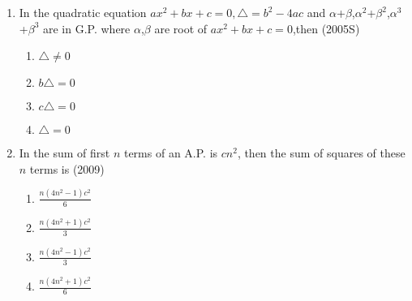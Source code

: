 \documentclass[journal]{IEEEtran}
\theoremstyle{remark}
\begin{document}
\begin{enumerate}
\begin{multicols}{4}
\begin{enumerate}
                \item $-10<x<0$
                \item $0<x<10$
                \item $x>10$
                \end{enumerate}
                \end{multicols}
\item In the quadratic equation $ax^2+bx+c=0,\triangle=b^2-4ac$ and $\alpha$+$\beta$,$\alpha^2$+$\beta^2$,$\alpha^3$+$\beta^3$ are in G.P. where $\alpha$,$\beta $ are root of $ax^2+bx+c=0$,then \hfill(2005S)
                \begin{multicols}{4}
                \begin{enumerate}
                    \item $\triangle\neq0$
                    \item $b\triangle=0$
                    \item $c\triangle=0$
                    \item $\triangle=0$
                \end{enumerate}
                \end{multicols}
\item In the sum of first $n$ terms of an A.P. is $cn^2$, then the sum of squares of these $n$ terms is \hfill(2009)
            \begin{multicols}{4}
                
            
             \begin{enumerate}
                    \item $\frac{n(4n^2-1)c^2}{6}$
                    \item $\frac{n(4n^2+1)c^2}{3}$
                    \item $\frac{n(4n^2-1)c^2}{3}$
                    \item $\frac{n(4n^2+1)c^2}{6}$
		\end{enumerate} 
         \end{multicols}
  

\end{enumerate}
\end{document}
